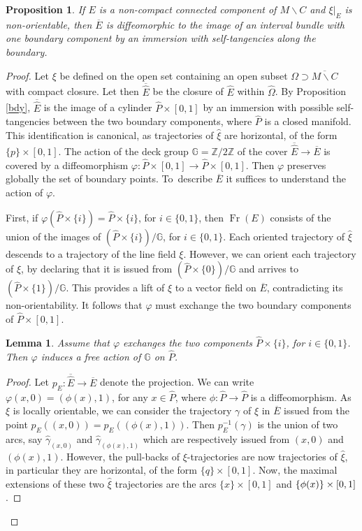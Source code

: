 \documentclass[10pt]{amsart}
\let\moins\smallsetminus
\DeclareMathOperator{\Fr}{Fr}
\newtheorem{lemma}[theorem]{Lemma}
\newtheorem{proposition}[theorem]{Proposition}
\theoremstyle{definition}
\theoremstyle{remark}
\numberwithin{equation}{section}
\newcommand{\ZZ}{\mathbb Z}
\begin{document}
\begin{proposition}\label{Ibundles}
If $E$ is a non-compact connected component of $M\moins C$ and $\xi|_E$ is non-orientable,
then $\overline{E}$ is diffeomorphic to the image of
an interval bundle with one boundary component by an immersion with self-tangencies along the
boundary.
\end{proposition}
\begin{proof}
Let $\xi$ be defined on the open set containing an open subset $\Omega\supset \overline{M\moins C}$ with compact closure.
Let then $\overline{\widehat{E}}$ be the closure of $\widehat{E}$ within $\widehat{\Omega}$.
By Proposition \ref{bdy}, $\overline{\widehat{E}}$ is the image of a cylinder
$\widehat{P}\times [0,1]$ by an immersion with possible self-tangencies between
the two boundary components, where $\widehat{P}$ is a closed manifold.
This identification is canonical, as trajectories of $\widehat{\xi}$ are horizontal, \ie of the form $\{p\}\times [0,1]$. The action of the deck group $\mathbb G=\ZZ/2\ZZ$ of the cover
$\overline{\widehat{E}}\to \overline{E}$ is covered by
a diffeomorphism $\varphi:\widehat{P}\times [0,1]\to \widehat{P}\times [0,1]$.
Then $\varphi$ preserves globally the set of boundary points.
To~describe $\overline{E}$ it suffices to understand the action of $\varphi$.

First, if $\varphi(\widehat{P}\times \{i\})=\widehat{P}\times \{i\}$, for $i\in \{0,1\}$,
then $\Fr(E)$ consists of the union of the images of
$(\widehat{P}\times \{i\})/\mathbb G$, for $i\in \{0,1\}$.
Each oriented trajectory of $\widehat{\xi}$ descends to a trajectory of the line field $\xi$.
However, we can orient each trajectory of $\xi$, by declaring that it is
issued from $(\widehat{P}\times \{0\})/\mathbb G$ and arrives to
$(\widehat{P}\times \{1\})/\mathbb G$.
This provides a lift of $\xi$ to a vector field on $\overline{E}$,
contradicting its non-orientability. It follows that $\varphi$ must exchange the two boundary components of $\widehat{P}\times [0,1]$.

\begin{lemma}\label{invol}
Assume that $\varphi$ exchanges the two components $\widehat{P}\times \{i\}$, for $i\in \{0,1\}$.
Then $\varphi$ induces
a free action of $\mathbb G$ on $\widehat{P}$.
\end{lemma}
\begin{proof}
Let $p_E:\overline{\widehat{E}}\to \overline{E}$ denote the projection.
We can write $\varphi(x,0)=(\phi(x),1)$, for any $x\in \widehat{P}$, where $\phi:\widehat{P}\to \widehat{P}$ is a diffeomorphism.
As $\xi$ is locally orientable, we can consider the trajectory $\gamma$ of $\xi$ in $\overline{E}$ issued from the point
$p_E((x,0))=p_E((\phi(x),1))$. Then $p_E^{-1}(\gamma)$ is the union of two arcs, say $\widehat{\gamma}_{(x,0)}$ and
$\widehat{\gamma}_{(\phi(x),1)}$ which are respectively issued from $(x,0)$ and $(\phi(x),1)$.
However, the pull-backs of $\xi$-trajectories are now trajectories of $\widehat{\xi}$, in particular they are
horizontal, \ie of the form $\{q\}\times [0,1]$.
Now, the maximal extensions of these two $\widehat{\xi}$ trajectories are the
arcs $\{x\}\times [0,1]$ and $\{\phi(x)\}\times\nobreak [0,1]$.


\end{proof}
\end{proof}
\end{document}
